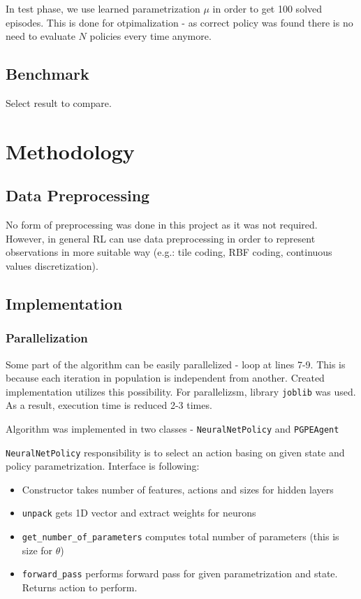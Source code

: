 \documentclass[12pt]{article}
\begin{document}
In test phase, we use learned parametrization $\mu$ in order to get 100 solved episodes. This is done for otpimalization - as correct policy was found there is no need to evaluate $N$ policies every time anymore.


\subsection{Benchmark}

Select result to compare.

\section{Methodology}
\subsection{Data Preprocessing}

No form of preprocessing was done in this project as it was not required. However, in general RL can use data preprocessing in order to represent observations in more suitable way (e.g.: tile coding, RBF coding, continuous values discretization).

\subsection{Implementation}

\subsubsection{Parallelization}

Some part of the algorithm can be easily parallelized - loop at lines 7-9. This is because each iteration in population is independent from another. Created implementation utilizes this possibility. For parallelizsm, library \texttt{joblib}\cite{joblib} was used. As a result, execution time is reduced 2-3 times.

Algorithm was implemented in two classes - \texttt{NeuralNetPolicy} and \texttt{PGPEAgent}

\texttt{NeuralNetPolicy} responsibility is to select an action basing on given state and policy parametrization. Interface is following:

\begin{itemize}
\item  Constructor takes number of features, actions and sizes for hidden layers

\item \texttt{unpack} gets 1D vector and extract weights for neurons 

\item \texttt{get\_number\_of\_parameters} computes total number of parameters (this is size for $\theta$)

\item \texttt{forward\_pass} performs forward pass for given parametrization and state. Returns action to perform.
\end{itemize}
\end{document}
